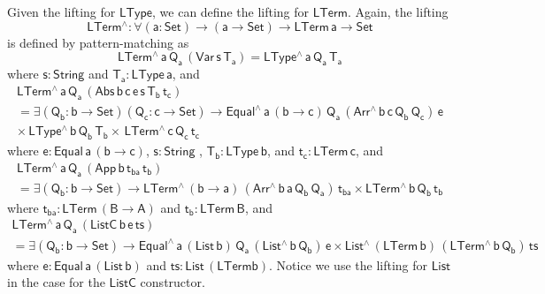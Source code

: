 \documentclass[acmsmall,screen,review,anonymous]{acmart}
\theoremstyle{definition}
\begin{document}
Given the lifting for $\mathsf{LType}$, we can define the lifting for $\mathsf{LTerm}$. Again, 
the lifting 
\[
\mathsf{LTerm^{\wedge} : \forall (a : Set) \to (a \to Set) \to LTerm\,a \to Set}
\]
is defined by pattern-matching as
\[
  \mathsf{LTerm^{\wedge}\,a\,Q_a\,(Var\,s\,T_a) = LType^{\wedge}\, a\, Q_a\, T_a}
\]
where $\mathsf{s : String}$ and $\mathsf{T_a : LType\, a}$,  and 
\begin{multline*}
  \mathsf{LTerm^{\wedge}\,a\,Q_a\,
  (Abs \,b \,c \,e \,s \,T_b \,t_c)} \\ 
\mathsf{
  = \exists (Q_b : b \to Set) (Q_c : c \to Set) \to
      Equal^{\wedge} \, a\, (b \to c)\, Q_a\, (Arr^{\wedge} \, b\, c\, Q_b \, Q_c)\, e} \\ 
\mathsf{
      \times \, LType^{\wedge}\, b\, Q_b\, T_b
      \times \, LTerm^{\wedge}\, c\, Q_c\, t_c }
\end{multline*}
where $\mathsf{e : Equal \, a \, (b \to c)}$, $\mathsf{s : String}$ , $\mathsf{T_b : LType\,b}$, and $\mathsf{t_c : LTerm \, c}$,
and 
\begin{multline*}
  \mathsf{LTerm^{\wedge}\,a\,Q_a\, (App\, b\, t_{ba}\, t_b)} \\ 
\mathsf{
  = \exists (Q_b : b \to Set) \to 
      LTerm^{\wedge}\, (b \to a)\, (Arr^{\wedge} \, b\, a\, Q_b \, Q_a)\, t_{ba}
      \times LTerm^{\wedge}\, b\, Q_b\, t_b }
\end{multline*}
where $\mathsf{t_{ba} : LTerm \, (B \to A)}$ and $\mathsf{t_b : LTerm \, B}$, and
\begin{multline*}
  \mathsf{LTerm^{\wedge}\,a\,Q_a\, (ListC\, b\, e\, ts)} \\ 
\mathsf{
  = \exists (Q_b : b \to Set) \to 
      Equal^{\wedge} \, a\, (List\,b)\, Q_a\, (List^{\wedge} \, b\, Q_b) \, e
      \times List^{\wedge}\, (LTerm\,b) \, (LTerm^{\wedge} \, b\, Q_b) \, ts
    }
\end{multline*}
where $\mathsf{e : Equal\, a\, (List \,b)}$ and $\mathsf{ts : List\, (LTerm b)}$. 
Notice we use the lifting for $\mathsf{List}$ in the case for the $\mathsf{ListC}$ constructor. 
\end{document}
